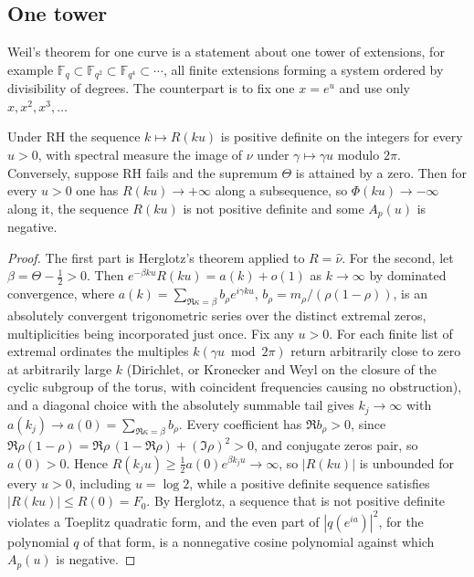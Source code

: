 \subsection{One tower}
Weil's theorem for one curve is a statement about one tower of extensions, for example $\mathbb F_q\subset\mathbb F_{q^2}\subset\mathbb F_{q^4}\subset\cdots$, all finite extensions forming a system ordered by divisibility of degrees. The counterpart is to fix one $x=e^u$ and use only $x,x^2,x^3,\dots$
\begin{theorem}\label{st:thm:tower}
Under RH the sequence $k\mapsto R(ku)$ is positive definite on the integers for every $u>0$, with spectral measure the image of $\nu$ under $\gamma\mapsto\gamma u$ modulo $2\pi$. Conversely, suppose RH fails and the supremum $\Theta$ is attained by a zero. Then for every $u>0$ one has $R(ku)\to+\infty$ along a subsequence, so $\Phi(ku)\to-\infty$ along it, the sequence $R(ku)$ is not positive definite and some $A_p(u)$ is negative.
\end{theorem}
\begin{proof}
The first part is Herglotz's theorem applied to $R=\hat\nu$. For the second, let $\beta=\Theta-\tfrac12>0$. Then $e^{-\beta ku}R(ku)=a(k)+o(1)$ as $k\to\infty$ by dominated convergence, where $a(k)=\sum_{\Re\kappa=\beta}b_\rho e^{i\gamma ku}$, $b_\rho=m_\rho/(\rho(1-\rho))$, is an absolutely convergent trigonometric series over the distinct extremal zeros, multiplicities being incorporated just once. Fix any $u>0$. For each finite list of extremal ordinates the multiples $k(\gamma u\bmod2\pi)$ return arbitrarily close to zero at arbitrarily large $k$ (Dirichlet, or Kronecker and Weyl on the closure of the cyclic subgroup of the torus, with coincident frequencies causing no obstruction), and a diagonal choice with the absolutely summable tail gives $k_j\to\infty$ with $a(k_j)\to a(0)=\sum_{\Re\kappa=\beta}b_\rho$. Every coefficient has $\Re b_\rho>0$, since $\Re\rho(1-\rho)=\Re\rho\,(1-\Re\rho)+(\Im\rho)^2>0$, and conjugate zeros pair, so $a(0)>0$. Hence $R(k_ju)\ge\tfrac12a(0)e^{\beta k_ju}\to\infty$, so $|R(ku)|$ is unbounded for every $u>0$, including $u=\log2$, while a positive definite sequence satisfies $|R(ku)|\le R(0)=F_0$. By Herglotz, a sequence that is not positive definite violates a Toeplitz quadratic form, and the even part of $|q(e^{ia})|^2$, for the polynomial $q$ of that form, is a nonnegative cosine polynomial against which $A_p(u)$ is negative.
\end{proof}
